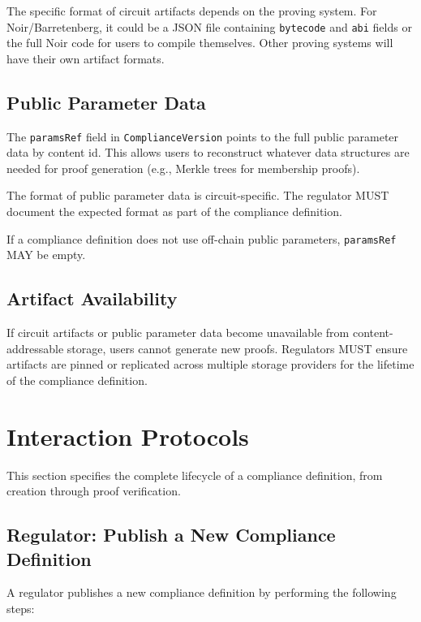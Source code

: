 \documentclass[9pt]{extreport}
\begin{document}
The specific format of circuit artifacts depends on the proving system. For Noir/Barretenberg, it could be a JSON file containing \texttt{bytecode} and \texttt{abi} fields or the full Noir code for users to compile themselves. Other proving systems will have their own artifact formats.

\subsection{Public Parameter Data}
\label{sec:public-parameter-data}

The \texttt{paramsRef} field in \texttt{ComplianceVersion} points to the full public parameter data by content id. This allows users to reconstruct whatever data structures are needed for proof generation (e.g., Merkle trees for membership proofs).

The format of public parameter data is circuit-specific. The regulator MUST document the expected format as part of the compliance definition.

If a compliance definition does not use off-chain public parameters, \texttt{paramsRef} MAY be empty.


\subsection{Artifact Availability}
\label{sec:artifact-availability}

If circuit artifacts or public parameter data become unavailable from content-addressable storage, users cannot generate new proofs. Regulators MUST ensure artifacts are pinned or replicated across multiple storage providers for the lifetime of the compliance definition.

\section{Interaction Protocols}
\label{sec:interaction-protocols}

This section specifies the complete lifecycle of a compliance definition, from creation through proof verification.

\subsection{Regulator: Publish a New Compliance Definition}
\label{sec:regulator-publish}

A regulator publishes a new compliance definition by performing the following steps:
\end{document}
